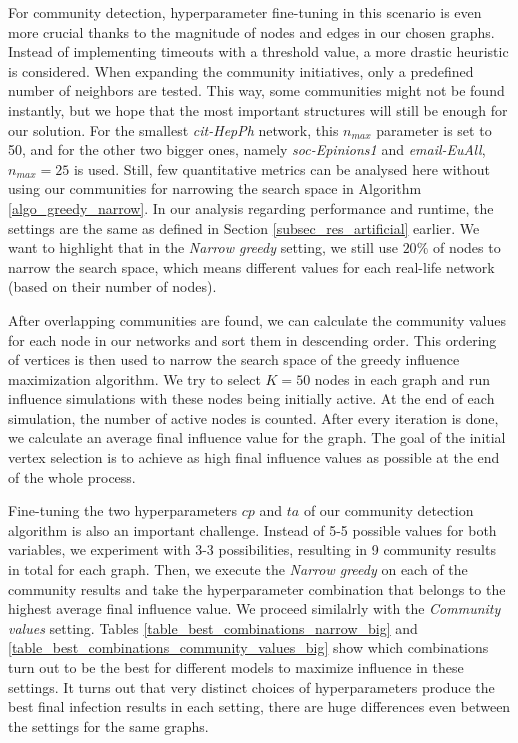 \documentclass[pdflatex,sn-mathphys-num]{sn-jnl}
\begin{document}
For community detection, hyperparameter fine-tuning in this scenario is even more crucial thanks to the magnitude of nodes and edges in our chosen graphs. Instead of implementing timeouts with a threshold value, a more drastic heuristic is considered. When expanding the community initiatives, only a predefined number of neighbors are tested. This way, some communities might not be found instantly, but we hope that the most important structures will still be enough for our solution. For the smallest \textit{cit-HepPh} network, this $n_{max}$ parameter is set to 50, and for the other two bigger ones, namely \textit{soc-Epinions1} and \textit{email-EuAll}, $n_{max} = 25$ is used. Still, few quantitative metrics can be analysed here without using our communities for narrowing the search space in Algorithm \ref{algo_greedy_narrow}. In our analysis regarding performance and runtime, the settings are the same as defined in Section \ref{subsec_res_artificial} earlier. We want to highlight that in the \textit{Narrow greedy} setting, we still use $20\%$ of nodes to narrow the search space, which means different values for each real-life network (based on their number of nodes).

After overlapping communities are found, we can calculate the community values for each node in our networks and sort them in descending order. This ordering of vertices is then used to narrow the search space of the greedy influence maximization algorithm. We try to select $K = 50$ nodes in each graph and run influence simulations with these nodes being initially active. At the end of each simulation, the number of active nodes is counted. After every iteration is done, we calculate an average final influence value for the graph. The goal of the initial vertex selection is to achieve as high final influence values as possible at the end of the whole process.

Fine-tuning the two hyperparameters $cp$ and $ta$ of our community detection algorithm is also an important challenge. Instead of 5-5 possible values for both variables, we experiment with 3-3 possibilities, resulting in 9 community results in total for each graph. Then, we execute the \textit{Narrow greedy} on each of the community results and take the hyperparameter combination that belongs to the highest average final influence value. We proceed similalrly with the \textit{Community values} setting. Tables \ref{table_best_combinations_narrow_big} and \ref{table_best_combinations_community_values_big} show which combinations turn out to be the best for different models to maximize influence in these settings. It turns out that very distinct choices of hyperparameters produce the best final infection results in each setting, there are huge differences even between the settings for the same graphs.
\end{document}
